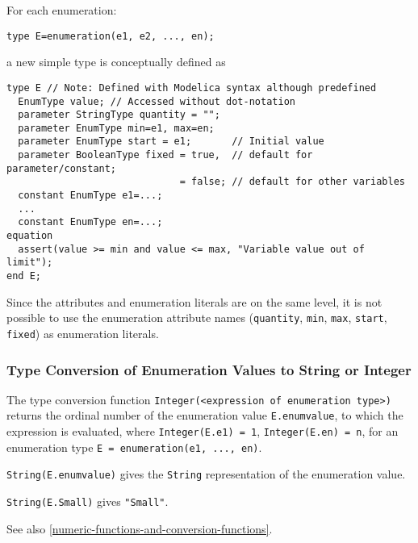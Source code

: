 For each enumeration:
\begin{lstlisting}[language=modelica]
type E=enumeration(e1, e2, ..., en);
\end{lstlisting}

a new simple type is conceptually defined as

\begin{lstlisting}[language=modelica]
type E // Note: Defined with Modelica syntax although predefined
  EnumType value; // Accessed without dot-notation
  parameter StringType quantity = "";
  parameter EnumType min=e1, max=en;
  parameter EnumType start = e1;       // Initial value
  parameter BooleanType fixed = true,  // default for parameter/constant;
                              = false; // default for other variables
  constant EnumType e1=...;
  ...
  constant EnumType en=...;
equation
  assert(value >= min and value <= max, "Variable value out of limit");
end E;
\end{lstlisting}

\begin{nonnormative}
Since the attributes and enumeration literals are on the same
level, it is not possible to use the enumeration attribute names
(\lstinline!quantity!, \lstinline!min!, \lstinline!max!, \lstinline!start!, \lstinline!fixed!) as enumeration literals.
\end{nonnormative}

\subsubsection{Type Conversion of Enumeration Values to String or Integer}\label{type-conversion-of-enumeration-values-to-string-or-integer}

The type conversion function \lstinline!Integer(<expression of enumeration type>)! returns the ordinal number of the
enumeration value \lstinline!E.enumvalue!, to which the expression is evaluated,
where \lstinline!Integer(E.e1) = 1!, \lstinline!Integer(E.en) = n!, for an enumeration type
\lstinline!E = enumeration(e1, ..., en)!.

\lstinline!String(E.enumvalue)! gives the \lstinline!String! representation of the enumeration value.

\begin{example}
\lstinline!String(E.Small)! gives \lstinline!"Small"!.
\end{example}

See also \cref{numeric-functions-and-conversion-functions}.

